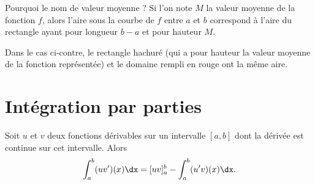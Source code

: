 \documentclass[11pt,fleqn, openany]{book} %
\begin{document}
\begin{minipage}{0.65\linewidth}
Pourquoi le nom de valeur moyenne ? Si l'on note $M$ la valeur moyenne de la fonction $f$, alors l'aire sous la courbe de $f$ entre $a$ et $b$ correspond à l'aire du rectangle ayant pour longueur $b-a$ et pour hauteur $M$.

Dans le cas ci-contre, le rectangle hachuré (qui a pour hauteur la valeur moyenne de la fonction représentée) et le domaine rempli en rouge ont la même aire.\end{minipage}\hfill\begin{minipage}{0.3\linewidth}


\end{minipage}



\section{Intégration par parties}

\begin{proposition}Soit $u$ et $v$ deux fonctions dérivables sur un intervalle $[a,b]$ dont la dérivée est continue sur cet intervalle. Alors
\[\displaystyle\int_{a}^b (uv')(x)\dx=[uv]_a^b-\displaystyle\int_{a}^b (u'v)(x)\dx.\]\end{proposition}
\end{document}
